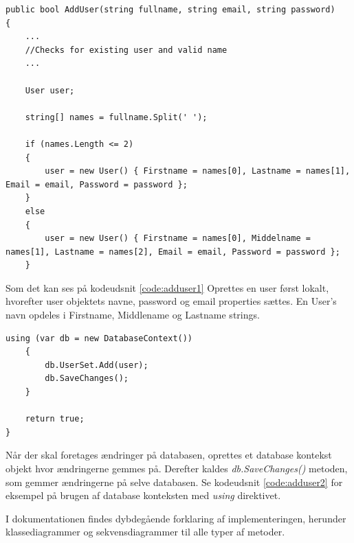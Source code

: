 \begin{lstlisting}[caption=User laves lokalt hvorefter User's navne properties sættes, label=code:adduser1]
public bool AddUser(string fullname, string email, string password)
{
	...
	//Checks for existing user and valid name
	...
	
	User user;

	string[] names = fullname.Split(' ');

	if (names.Length <= 2)
	{
		user = new User() { Firstname = names[0], Lastname = names[1], Email = email, Password = password };
	}
	else
	{
		user = new User() { Firstname = names[0], Middelname = names[1], Lastname = names[2], Email = email, Password = password };
	}
\end{lstlisting}

Som det kan ses på kodeudsnit \ref{code:adduser1} Oprettes en user først lokalt, hvorefter user objektets navne, password og email properties sættes. En User's navn opdeles i Firstname, Middlename og Lastname strings. 

\begin{lstlisting}[caption=User objektet tilføjes i database konteksten hvorefter der gemmes på selve databasen,label=code:adduser2]
	using (var db = new DatabaseContext())
	{
		db.UserSet.Add(user);
		db.SaveChanges();
	}

	return true;
}
\end{lstlisting}

Når der skal foretages ændringer på databasen, oprettes et database kontekst objekt hvor ændringerne gemmes på. Derefter kaldes \textit{db.SaveChanges()} metoden, som gemmer ændringerne på selve databasen. Se kodeudsnit \ref{code:adduser2} for eksempel på brugen af database konteksten med \textit{using} direktivet.

I dokumentationen findes dybdegående forklaring af implementeringen, herunder klassediagrammer og sekvensdiagrammer til alle typer af metoder. 

